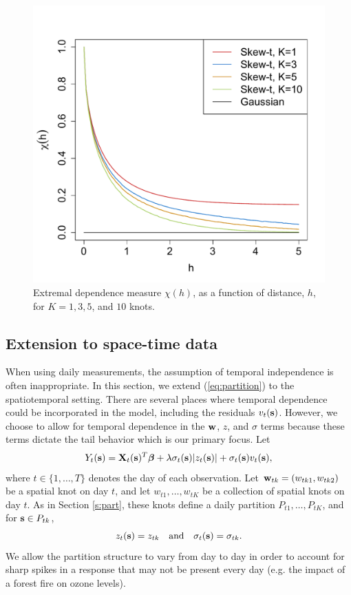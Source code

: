 \documentclass[useAMS,usenatbib,referee]{biom}
\providecommand{\DIFadd}[1]{{\protect\color{blue}\uwave{#1}}} %
\providecommand{\DIFdel}[1]{{\protect\color{red}\sout{#1}}}                      %
\providecommand{\DIFaddbegin}{} %
\providecommand{\DIFaddend}{} %
\providecommand{\DIFdelbegin}{} %
\providecommand{\DIFdelend}{} %
\begin{document}
\begin{figure}
  \centering
  \includegraphics[width=0.5\linewidth]{plots/chi-h.pdf}
  \caption{Extremal dependence measure $\chi(h)$, as a function of distance, $h$, for $K = 1, 3, 5$, and $10$ knots.}
  \label{fig:chi}
\end{figure}

\subsection{Extension to space-time data} \label{s:temporal}
When using daily measurements, the assumption of temporal independence is often inappropriate.
In this section, we extend (\ref{eq:partition}) to the spatiotemporal setting.
There are several places where temporal dependence could be incorporated in the model, including the residuals $v_t(\mbox{\bf s})$.
However, we choose to allow for temporal dependence in the $\mbox{\bf w}$, $z$, and $\sigma$ terms because these terms dictate the tail behavior which is our primary focus.
Let
\begin{align} \label{eq:spatiotemp}
  Y_t(\bs) = \bX_t(\bs)^T \bbeta + \lambda \sigma_t(\bs) |z_t(\bs)| + \sigma_t(\bs) v_t(\bs),
\end{align}
where $t \in \{1, \ldots, T\}$ denotes the day of each observation.
Let \hbox{$\mbox{\bf w}_{tk} = (w_{tk1}, w_{tk2})$} be a spatial knot on day $t$, and let \DIFdelbegin \DIFdel{$w_{t1}, \ldots, w_{tK}$ }\DIFdelend \DIFaddbegin \DIFadd{$\bw_{t1}, \ldots, \bw_{tK}$ }\DIFaddend be a collection of spatial knots on day $t$.
As in Section \ref{s:part}, these knots define a daily partition $P_{t1}, \ldots, P_{tK}$, and for $\mbox{\bf s} \in P_{tk}$,
\begin{align}
  z_t(\mbox{\bf s}) = z_{tk}\quad \text{and} \quad \sigma_{t}(\mbox{\bf s}) = \sigma_{tk}.
\end{align}
We allow the partition structure to vary from day to day in order to account for sharp spikes in a response that may not be present every day (e.g. the impact of a forest fire on ozone levels).
\end{document}
